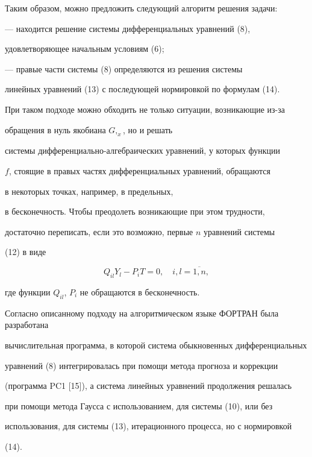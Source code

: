 Таким образом, можно предложить следующий алгоритм решения задачи:





--- находится решение системы дифференциальных уравнений (8),


удовлетворяющее начальным условиям (6);





--- правые части системы (8) определяются из решения системы


линейных уравнений (13) с последующей нормировкой по формулам (14).





При таком подходе можно обходить не только ситуации, возникающие из-за


обращения в нуль якобиана $G,_x$, но и решать


системы дифференциально-алгебраических уравнений, у которых функции


$f$, стоящие в правых частях  дифференциальных уравнений, обращаются


в некоторых точках, например, в предельных,


в бесконечность. Чтобы преодолеть возникающие при этом трудности,


достаточно переписать, если это возможно, первые $n$ уравнений системы


(12) в виде


$$


Q_{il} Y_l-P_i T=0,\quad i, l=\overline{1, n},


$$


где функции $Q_{il}$, $P_i$ не обращаются в бесконечность.





Согласно описанному подходу на алгоритмическом языке ФОРТРАН была разработана


вычислительная программа, в которой система обыкновенных дифференциальных


уравнений (8) интегрировалась при помощи метода прогноза и коррекции


(программа PC1 [15]), а система линейных уравнений продолжения решалась


при помощи метода Гаусса с использованием, для системы (10), или без


использования, для системы (13), итерационного процесса, но с нормировкой


(14).





